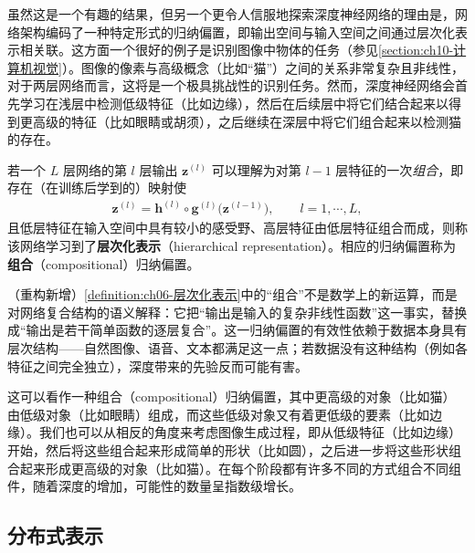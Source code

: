 \documentclass[../../main.tex]{subfiles}
\begin{document}
虽然这是一个有趣的结果，但另一个更令人信服地探索深度神经网络的理由是，网络架构编码了一种特定形式的归纳偏置，即输出空间与输入空间之间通过层次化表示相关联。这方面一个很好的例子是识别图像中物体的任务（参见\cref{section:ch10-计算机视觉}）。图像的像素与高级概念（比如“猫”）之间的关系非常复杂且非线性，对于两层网络而言，这将是一个极具挑战性的识别任务。然而，深度神经网络会首先学习在浅层中检测低级特征（比如边缘），然后在后续层中将它们结合起来以得到更高级的特征（比如眼睛或胡须），之后继续在深层中将它们组合起来以检测猫的存在。

\begin{definition}[层次化表示]\label{definition:ch06-层次化表示}
若一个 $L$ 层网络的第 $l$ 层输出 $\boldsymbol{z}^{(l)}$ 可以理解为对第 $l-1$ 层特征的一次\emph{组合}，即存在（在训练后学到的）映射使
\begin{align}
\boldsymbol{z}^{(l)}=\boldsymbol{h}^{(l)}\circ\boldsymbol{g}^{(l)}\bigl(\boldsymbol{z}^{(l-1)}\bigr),\qquad l=1,\cdots,L,
\label{align:ch06-层次化表示}
\end{align}
且低层特征在输入空间中具有较小的感受野、高层特征由低层特征组合而成，则称该网络学习到了\textbf{层次化表示}（hierarchical representation）。相应的归纳偏置称为\textbf{组合}（compositional）归纳偏置。
\end{definition}

\begin{remark}（重构新增）\cref{definition:ch06-层次化表示}中的“组合”不是数学上的新运算，而是对网络复合结构的语义解释：它把“输出是输入的复杂非线性函数”这一事实，替换成“输出是若干简单函数的逐层复合”。这一归纳偏置的有效性依赖于数据本身具有层次结构——自然图像、语音、文本都满足这一点；若数据没有这种结构（例如各特征之间完全独立），深度带来的先验反而可能有害。
\end{remark}

这可以看作一种组合（compositional）归纳偏置，其中更高级的对象（比如猫）由低级对象（比如眼睛）组成，而这些低级对象又有着更低级的要素（比如边缘）。我们也可以从相反的角度来考虑图像生成过程，即从低级特征（比如边缘）开始，然后将这些组合起来形成简单的形状（比如圆），之后进一步将这些形状组合起来形成更高级的对象（比如猫）。在每个阶段都有许多不同的方式组合不同组件，随着深度的增加，可能性的数量呈指数级增长。

\subsection{分布式表示}\label{subsection:ch06-分布式表示}
\end{document}
